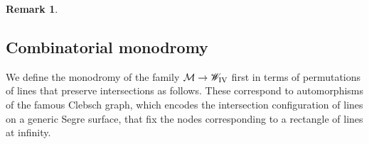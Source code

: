 \documentclass[a4paper,reqno]{amsart}
\numberwithin{equation}{section}
\newtheorem{remark}[theorem]{Remark}
\numberwithin{equation}{section}
\begin{document}
\begin{remark}
\end{remark}



\subsection{Combinatorial monodromy}

We define the monodromy of the family $\mathcal{M}\to\mathscr{W}_{\rm{IV}}$ first in terms of permutations of lines that preserve intersections as follows. 
These correspond to automorphisms of the famous Clebsch graph, which encodes the intersection configuration of lines on a generic Segre surface, that fix the nodes corresponding to a rectangle of lines at infinity.
\end{document}
